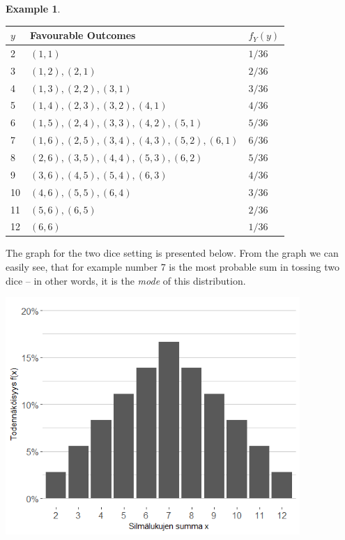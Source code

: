 \documentclass[12pt,a4paper,leqno]{report}
\theoremstyle{plain}
\theoremstyle{definition}
\newtheorem{esim}[equation]{Example}
\begin{document}
\begin{esim}
\begin{enumerate}[(i)]
\begin{tabular}{l l l}
\toprule
 $y$ & Favourable Outcomes  & $f_Y(y)$ \\
\midrule
 2 & $(1,1)$ & $1/36$ \\
 3 & $(1,2), (2,1)$ & $2/36$ \\
 4 & $(1,3), (2,2), (3,1)$ & $3/36$ \\
 5 & $(1,4), (2,3), (3,2), (4,1)$ & $4/36$ \\
 6 & $(1,5), (2,4), (3,3), (4,2), (5,1)$ & $5/36$ \\
 7 & $(1,6), (2,5), (3,4), (4,3), (5,2), (6,1)$ & $6/36$ \\
 8 & $(2,6), (3,5), (4,4), (5,3), (6,2)$ & $5/36$ \\
 9 & $(3,6), (4,5), (5,4), (6,3)$ & $4/36$ \\
 10 & $(4,6), (5,5), (6,4)$ & $3/36$ \\
 11 & $(5,6), (6,5)$ & $2/36$ \\
 12 & $(6,6)$ & $1/36$ \\
 \bottomrule 
\end{tabular}

\bigskip

The graph for the two dice setting is presented below. From the graph we can easily see, that for example number 7 is the most probable sum in tossing two dice -- in other words, it is the \emph{mode} of this distribution.

\begin{center}
\includegraphics[height = 9cm]{noppa2.png}
\end{center}


\end{enumerate}
\end{esim}
\end{document}
